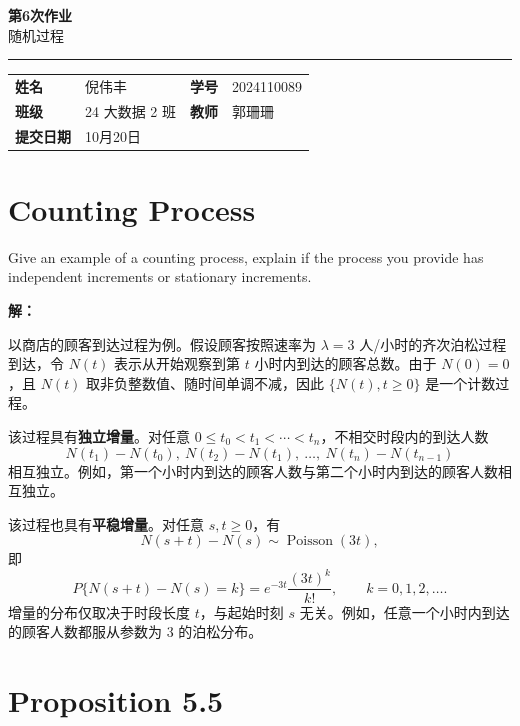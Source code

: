 \documentclass[12pt,a4paper]{article}
\newcommand{\course}{随机过程}
\newcommand{\homeworktitle}{第6次作业}
\newcommand{\studentname}{倪伟丰}
\newcommand{\studentid}{2024110089}
\newcommand{\classname}{24 大数据 2 班}
\newcommand{\teacher}{郭珊珊}
\newcommand{\duedate}{10月20日} %
\begin{document}
\begin{center}
  {\Huge\bfseries\color{mainblue}\homeworktitle}\\[0.6em]
  {\Large\course}\\[1.2em]
  {\color{linegray}\rule{0.9\textwidth}{0.8pt}}
\end{center}

\begin{infobox}
\begin{tabularx}{\linewidth}{>{\bfseries}p{2.2cm} X >{\bfseries}p{2.2cm} X}
姓名 & \studentname & 学号 & \studentid \\
班级 & \classname & 教师 & \teacher \\
提交日期 & \duedate &  &  \\
\end{tabularx}
\end{infobox}

\section{Counting Process}

Give an example of a counting process, explain if the process you provide has independent increments or stationary increments.

\begin{answerbox}
\textbf{解：}

以商店的顾客到达过程为例。假设顾客按照速率为 $\lambda=3$ 人/小时的齐次泊松过程到达，令 $N(t)$ 表示从开始观察到第 $t$ 小时内到达的顾客总数。由于 $N(0)=0$，且 $N(t)$ 取非负整数值、随时间单调不减，因此 $\{N(t),t\geq 0\}$ 是一个计数过程。

该过程具有\textbf{独立增量}。对任意 $0\leq t_0<t_1<\cdots<t_n$，不相交时段内的到达人数
$$
N(t_1)-N(t_0),\ N(t_2)-N(t_1),\ \ldots,\ N(t_n)-N(t_{n-1})
$$
相互独立。例如，第一个小时内到达的顾客人数与第二个小时内到达的顾客人数相互独立。

该过程也具有\textbf{平稳增量}。对任意 $s,t\geq 0$，有
$$
N(s+t)-N(s)\sim\operatorname{Poisson}(3t),
$$
即
$$
P\{N(s+t)-N(s)=k\}=e^{-3t}\frac{(3t)^k}{k!},
\qquad k=0,1,2,\ldots.
$$
增量的分布仅取决于时段长度 $t$，与起始时刻 $s$ 无关。例如，任意一个小时内到达的顾客人数都服从参数为 $3$ 的泊松分布。
\end{answerbox}

\section{Proposition 5.5}
\end{document}
